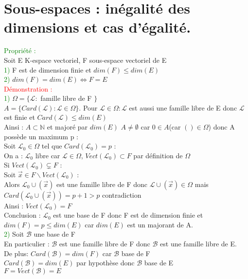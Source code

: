 \documentclass{article}
\begin{document}
\section{Sous-espaces : inégalité des dimensions et cas d'égalité. }
\textcolor{green}{Propriété :} \\
Soit E K-espace vectoriel, F sous-espace vectoriel de E \\
\textcolor{green}{1)} F est de dimension finie et $dim(F) \leq dim(E)$ \\
\textcolor{green}{2)} $dim(F)=dim(E) \Longleftrightarrow F=E$ \\
\textcolor{red}{Démonstration :} \\
\textcolor{green}{1)} $\Omega=\lbrace \mathcal L :$ famille libre de F $\rbrace$ \\
$A=\lbrace Card(\mathcal L) : \mathcal L \in \Omega \rbrace$. Pour $\mathcal L \in \Omega  : \mathcal L$ est aussi une famille libre de E donc $\mathcal L$ est finie et $Card(\mathcal L) \leq dim(E)$ \\
Ainsi : $A \subset \mathbb N$ et majoré par $dim(E)$ $A \neq \emptyset$  car $0 \in A$(car $()\in \Omega$) donc A possède un maximum p : \\
Soit $\mathcal L_0 \in \Omega$ tel que $Card(\mathcal L_0) = p $ : \\
On a : $\mathcal L_0$ libre car $\mathcal L \in \Omega$, $Vect(\mathcal L_0) \subset F$ par définition de $ \Omega $ \\
Si $Vect(\mathcal L_0) \subsetneq F$ : \\
Soit $\vec x \in  F \backslash Vect (\mathcal L_0)$ : \\
Alors $\mathcal L_0 \cup (\vec x)$ est une famille libre de F donc $\mathcal L \cup (\vec x) \in \Omega$ mais $Card(\mathcal L_0 \cup (\vec x))=p+1>p$ contradiction \\
Ainsi : $Vect(\mathcal L_0)=F$ \\
Conclusion : $\mathcal L_0$ est une base de F donc F est de dimension finie et $dim(F)=p \leq dim(E)$ car $dim(E)$ est un majorant de A. \\
\textcolor{green}{2)} Soit $ \mathcal B$ une base de F \\
En particulier : $ \mathcal B$ est une famille libre de F donc $ \mathcal B$ est une famille libre de E. \\
De plus: $Card(\mathcal B)=dim(F)$ car $\mathcal B$ base de F \\
$Card(\mathcal B)=dim(E)$ par hypothèse donc $\mathcal B$ base de E \\
$F=Vect(\mathcal B)=E$ \\
\end{document}
